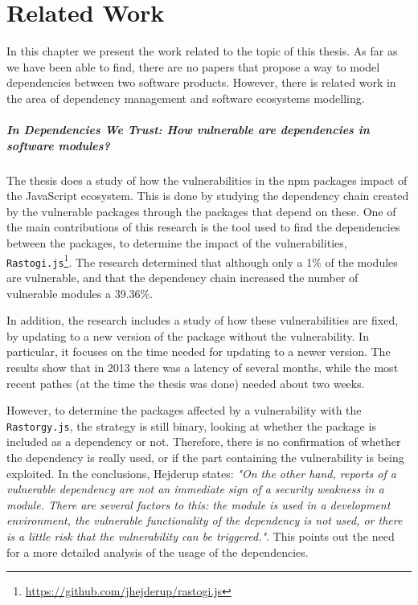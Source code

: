 \chapter{Related Work}\label{ch:RelatedWork}
In this chapter we present the work related to the topic of this thesis.
As far as we have been able to find, there are no papers that propose a way to model dependencies between two software products. However, there is related work in the area of dependency management and software ecosystems modelling.

\paragraph{In Dependencies We Trust: How vulnerable are dependencies in software modules? \cite{hejderup2015dependencies}}
The thesis does a study of how the vulnerabilities in the npm packages impact of the JavaScript ecosystem. This is done by studying the dependency chain created by the vulnerable packages through the packages that depend on these. One of the main contributions of this research is the tool used to find the dependencies between the packages, to determine the impact of the vulnerabilities, \texttt{Rastogi.js}\footnote{\href{https://github.com/jhejderup/rastogi.js}{https://github.com/jhejderup/rastogi.js}}. The research determined that although only a 1\% of the modules are vulnerable, and that the dependency chain increased the number of vulnerable modules a 39.36\%.

In addition, the research includes a study of how these vulnerabilities are fixed, by updating to a new version of the package without the vulnerability. In particular, it focuses on the time needed for updating to a newer version. The results show that in 2013 there was a latency of several months, while the most recent pathes (at the time the thesis was done) needed about two weeks.

However, to determine the packages affected by a vulnerability with the \texttt{Rastorgy.js}, the strategy is still binary, looking at whether the package is included as a dependency or not. Therefore, there is no confirmation of whether the dependency is really used, or if the part containing the vulnerability is being exploited. In the conclusions, Hejderup states: \textit{"On the other hand, reports of a vulnerable dependency are not an immediate sign of a security weakness in a module. There are several factors to this: the module is used in a development environment, the vulnerable functionality of the dependency is not used, or there is a little risk that the vulnerability can be triggered."}. This points out the need for a more detailed analysis of the usage of the dependencies.

